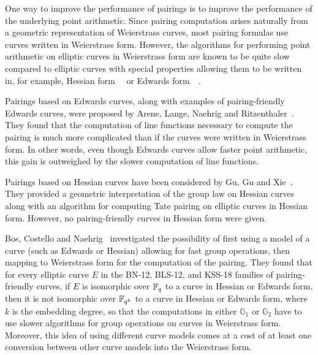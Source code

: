 One way to improve the performance of pairings is
to improve the performance of the underlying point arithmetic.
Since pairing computation arises naturally from a geometric representation of Weierstrass curves,
most pairing formulas use curves written in Weierstrass form.
However, the algorithms for performing point arithmetic on elliptic curves in Weierstrass form
are known to be quite slow compared to elliptic curves with special properties allowing them to be written in,
for example, Hessian form~\cite{2001/smart}~\cite{2001/joye} or
Edwards form~\cite{2007/edwards}~\cite{2007/bernstein-newelliptic}.

Pairings based on Edwards curves,
along with examples of pairing-friendly Edwards curves,
were proposed by Arene, Lange, Naehrig and Ritzenthaler~\cite{2009/fastertate}.
They found that the computation of line functions necessary to compute the pairing
is much more complicated than if the curves were written in Weierstrass form.
In other words,
even though Edwards curves allow faster point arithmetic,
this gain is outweighed by the slower computation of line functions.

Pairings based on Hessian curves have been considered by Gu, Gu and Xie~\cite{2010/Gu}.
They provided a geometric interpretation of the group law on Hessian curves
along with an algorithm for computing Tate pairing on elliptic curves in Hessian form.
However, no pairing-friendly curves in Hessian form were given.

Bos, Costello and Naehrig~\cite{2013/bos-pairing} investigated the possibility of first
using a model of a curve (such as Edwards or Hessian) allowing for fast group operations,
then mapping to Weierstrass form for the computation of the pairing.
They found that for every elliptic curve $E$ in the BN-12, BLS-12, and KSS-18 families of pairing-friendly curves,
if $E$ is isomorphic over $\mathbb{F}_{q}$ to a curve in Hessian or Edwards form,
then it is not isomorphic over $\mathbb{F}_{q^{k}}$ to a curve in Hessian or Edwards form,
where $k$ is the embedding degree, so that the computations in either $\mathbb{G}_1$ or $\mathbb{G}_2$
have to use slower algorithms for group operations on curves in Weierstrass form.
Moreover, this idea of using different curve models comes at a cost of at least one conversion
between other curve models into the Weierstrass form.

